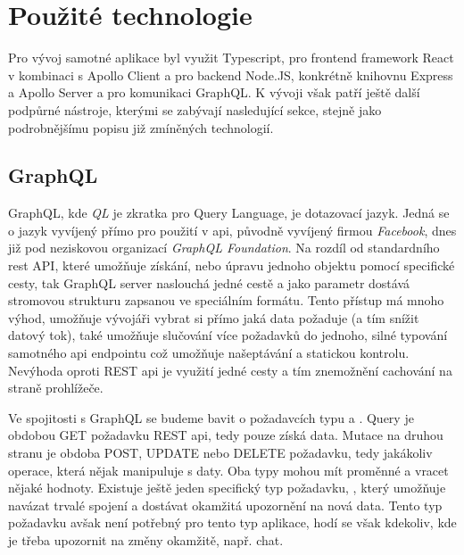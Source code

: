 \section{Použité technologie}
\label{sc:used_techologies}

Pro vývoj samotné aplikace byl využit Typescript, pro frontend framework React v kombinaci s Apollo Client a pro backend Node.JS, konkrétně knihovnu Express a Apollo Server a pro komunikaci GraphQL. K vývoji však patří ještě další podpůrné nástroje, kterými se zabývají nasledující sekce, stejně jako podrobnějšímu popisu již zmíněných technologií.

\subsection{GraphQL}
\label{ss:graphql}
GraphQL, kde \emph{QL} je zkratka pro Query Language, je dotazovací jazyk. Jedná se o jazyk vyvíjený přímo pro použití v \acrshort{api}, původně vyvíjený firmou \emph{Facebook}, dnes již pod neziskovou organizací \emph{GraphQL Foundation}. Na rozdíl od standardního \acrshort{rest} API, které umožňuje získání, nebo úpravu jednoho objektu pomocí specifické cesty, tak GraphQL server naslouchá jedné cestě a jako parametr dostává stromovou strukturu zapsanou ve speciálním formátu. Tento přístup má mnoho výhod, umožňuje vývojáři vybrat si přímo jaká data požaduje (a tím snížit datový tok), také umožňuje slučování více požadavků do jednoho, silné typování samotného \acrshort{api} endpointu což umožňuje našeptávání a statickou kontrolu. Nevýhoda oproti REST \acrshort{api} je využití jedné cesty a tím znemožnění cachování na straně prohlížeče. \cite{brito2020rest}

Ve spojitosti s GraphQL se budeme bavit o požadavcích typu  a . Query je obdobou GET požadavku REST \acrshort{api}, tedy pouze získá data. Mutace na druhou stranu je obdoba POST, UPDATE nebo DELETE požadavku, tedy jakákoliv operace, která nějak manipuluje s daty. Oba typy mohou mít proměnné a vracet nějaké hodnoty. Existuje ještě jeden specifický typ požadavku, , který umožňuje navázat trvalé spojení a dostávat okamžitá upozornění na nová data. Tento typ požadavku avšak není potřebný pro tento typ aplikace, hodí se však kdekoliv, kde je třeba upozornit na změny okamžitě, např. chat. \cite{porcello_2018_learning}

